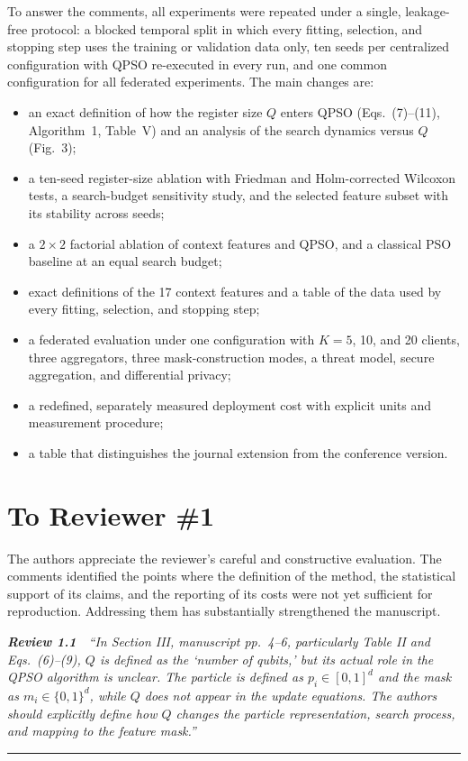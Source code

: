 \documentclass[11pt]{article}
\newcommand{\review}[2]{\par\bigskip\noindent\textbf{\textit{Review #1}}\ \ \textit{``#2''}\par\smallskip\hrule\medskip}
\begin{document}
To answer the comments, all experiments were repeated under a single,
leakage-free protocol: a blocked temporal split in which every fitting,
selection, and stopping step uses the training or validation data only, ten
seeds per centralized configuration with QPSO re-executed in every run, and
one common configuration for all federated experiments. The main changes are:
\begin{itemize}[leftmargin=*,itemsep=1pt]
  \item an exact definition of how the register size $Q$ enters QPSO
        (Eqs.~(7)--(11), Algorithm~1, Table~V) and an analysis of the search
        dynamics versus $Q$ (Fig.~3);
  \item a ten-seed register-size ablation with Friedman and Holm-corrected
        Wilcoxon tests, a search-budget sensitivity study, and the selected
        feature subset with its stability across seeds;
  \item a $2\times2$ factorial ablation of context features and QPSO, and a
        classical PSO baseline at an equal search budget;
  \item exact definitions of the 17 context features and a table of the data
        used by every fitting, selection, and stopping step;
  \item a federated evaluation under one configuration with $K=5$, 10, and
        20 clients, three aggregators, three mask-construction modes, a threat
        model, secure aggregation, and differential privacy;
  \item a redefined, separately measured deployment cost with explicit units
        and measurement procedure;
  \item a table that distinguishes the journal extension from the conference
        version.
\end{itemize}

\clearpage
\section*{To Reviewer \#1}

The authors appreciate the reviewer's careful and constructive evaluation.
The comments identified the points where the definition of the method, the
statistical support of its claims, and the reporting of its costs were not
yet sufficient for reproduction. Addressing them has substantially
strengthened the manuscript.

\review{1.1}{In Section III, manuscript pp.~4--6, particularly Table II and Eqs.~(6)--(9), $Q$ is defined as the `number of qubits,' but its actual role in the QPSO algorithm is unclear. The particle is defined as $p_i \in [0,1]^d$ and the mask as $m_i \in \{0,1\}^d$, while $Q$ does not appear in the update equations. The authors should explicitly define how $Q$ changes the particle representation, search process, and mapping to the feature mask.}
\end{document}
